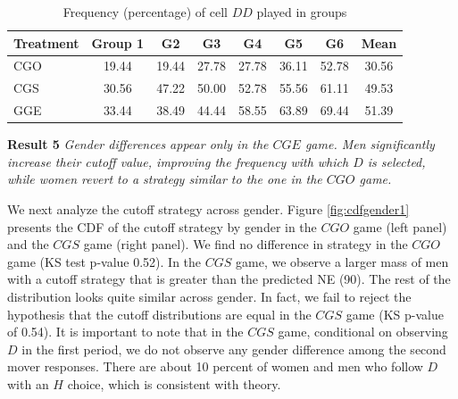 \documentclass[11pt,english]{article}
\begin{document}
\begin{table}[!t]
\centering
\caption{Frequency (percentage) of cell $DD$ played in groups }
\begin{tabular}{lccccccc}
\hline
Treatment & Group 1 & G2  & G3 & G4 & G5 & G6 & Mean\\
  \hline
  CGO &  19.44 & 19.44&  27.78 & 27.78 & 36.11 & 52.78 & 30.56 \\
  CGS & 30.56 & 47.22&  50.00 & 52.78 & 55.56 & 61.11 & 49.53\\
  GGE & 33.44 & 38.49 & 44.44 & 58.55 & 63.89 & 69.44 & 51.39 \\
  \hline

\end{tabular}

\label{table:dd}
\end{table}

\noindent \textbf{Result 5}
\textit{Gender differences appear only in the $CGE$ game. Men significantly increase their cutoff value, improving the frequency with which $D$ is selected, while women revert to a strategy similar to the one in the $CGO$ game.}

We next analyze the cutoff strategy across gender. Figure \ref{fig:cdfgender1} presents the CDF of the cutoff strategy by gender in the $CGO$ game (left panel) and the $CGS$  game (right panel). We find no difference in strategy in the $CGO$ game (KS test p-value 0.52). In the $CGS$ game, we observe a larger mass of men with a cutoff strategy that is greater than the predicted NE (90). The rest of the distribution looks quite similar across gender. In fact, we fail to reject the hypothesis that the cutoff distributions are equal in the $CGS$ game (KS p-value of 0.54). It is important to note that in the $CGS$ game, conditional on observing $D$ in the first period, we do not observe any gender difference among the second mover responses. There are about 10 percent of women and men who follow $D$ with an $H$ choice, which is consistent with theory.
\end{document}
